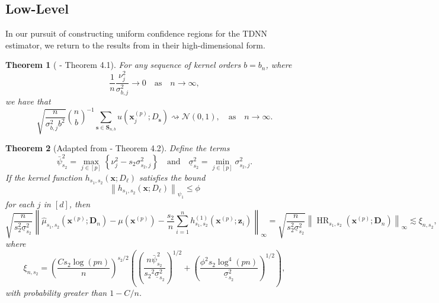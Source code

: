 \documentclass[letterpaper,10pt]{article}
\numberwithin{equation}{section}
\newtheorem{thm}{Theorem}
\numberwithin{thm}{section}
\renewcommand{\hat}{\widehat}
\newcommand{\1}{\mathbb{1}}
\begin{document}
\subsection{Low-Level}
In our pursuit of constructing uniform confidence regions for the TDNN estimator, we return to the results from \citet{ritzwoller_uniform_2024} in their high-dimensional form.
\vspace{0.5cm}
\begin{thm}[\citet{ritzwoller_uniform_2024} - Theorem 4.1]
	For any sequence of kernel orders $b=b_n$, where
	\begin{equation}
		\frac{1}{n} \frac{\nu_j^2}{\sigma_{b, j}^2} \rightarrow 0
		\quad \text{as} \quad
		n \rightarrow \infty,
	\end{equation}
	we have that
	\begin{equation}
		\sqrt{\frac{n}{\sigma_{b, j}^2 b^2}} \binom{n}{b}^{-1} \sum_{\mathbf{s} \in \mathbf{S}_{n, b}} u\left(\mathbf{x}^{(p)}_{j} ; D_{\mathbf{s}}\right) \rightsquigarrow \mathcal{N}(0,1),
		\quad \text{as} \quad
		n \rightarrow \infty.
	\end{equation}
\end{thm}

\vspace{0.5cm}
\begin{thm}[Adapted from \citet{ritzwoller_uniform_2024} - Theorem 4.2]\label{ritzwoller_Thm4_2}
	Define the terms
	\begin{equation}
		\bar{\psi}_{s_2}^2
		= \max_{j \in[p]}\left\{\nu_j^2- s_2 \sigma_{s_2, j}^2\right\}
		\quad \text {and} \quad
		\underline{\sigma}_{s_2}^2
		= \min_{j \in[p]} \sigma_{s_2, j}^2.
	\end{equation}
	If the kernel function $h_{s_1, s_2}\left(\mathbf{x} ; D_{\ell}\right)$ satisfies the bound
	\begin{equation}
		\left\|h_{s_1, s_2}\left(\mathbf{x} ; D_{\ell}\right)\right\|_{\psi_1} \leq \phi
	\end{equation}
	for each $j$ in $[d]$, then
	\begin{equation}
		\sqrt{\frac{n}{s_2^2 \underline{\sigma}_{s_2}^2}}
		\left\|\hat{\mu}_{s_1, s_2}(\mathbf{x}^{(p)}; \mathbf{D}_n) - \mu(\mathbf{x}^{(p)}) - \frac{s_2}{n} \sum_{i=1}^n h^{(1)}_{s_1, s_2}(\mathbf{x}^{(p)}; \mathbf{z}_{i})\right\|_{\infty}
		= \sqrt{\frac{n}{s_2^2 \underline{\sigma}_{s_2}^2}} \left\|\operatorname{HR}_{s_1, s_2}(\mathbf{x}^{(p)}; \mathbf{D}_n)\right\|_{\infty}
		\lesssim \xi_{n, s_2},
	\end{equation}
	where
	\begin{equation}
		\xi_{n, s_2}
		= \left(\frac{C s_2 \log(p n)}{n}\right)^{s_2 / 2}\left(\left(\frac{n \bar{\psi}_{s_2}^2}{{s_2}^2 \underline{\sigma}_{s_2}^2}\right)^{1 / 2}+\left(\frac{\phi^2 s_2 \log ^4(p n)}{\underline{\sigma}_{s_2}^2}\right)^{1 / 2}\right),
	\end{equation}
	with probability greater than $1-C / n$.
\end{thm}
\end{document}
